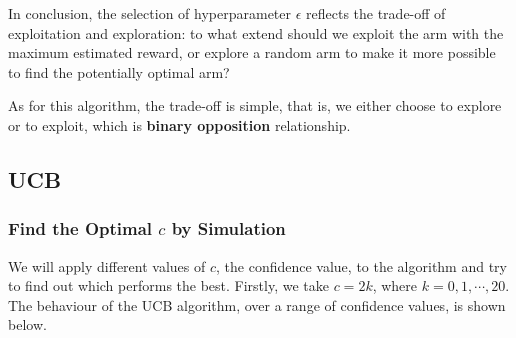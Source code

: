 \documentclass[11pt]{article}
\begin{document}
In conclusion, the selection of hyperparameter \(\epsilon\) reflects the
trade-off of exploitation and exploration: to what extend should we
exploit the arm with the maximum estimated reward, or explore a random
arm to make it more possible to find the potentially optimal arm?

As for this algorithm, the trade-off is simple, that is, we either
choose to explore or to exploit, which is \textbf{binary opposition}
relationship.

    \hypertarget{ucb}{%
\subsection{UCB}\label{ucb}}

    \hypertarget{find-the-optimal-c-by-simulation}{%
\subsubsection{\texorpdfstring{Find the Optimal \(c\) by
Simulation}{Find the Optimal c by Simulation}}\label{find-the-optimal-c-by-simulation}}

We will apply different values of \(c\), the confidence value, to the
algorithm and try to find out which performs the best. Firstly, we take
\(c=2k\), where \(k=0,1,\cdots,20\). The behaviour of the UCB algorithm,
over a range of confidence values, is shown below.
\end{document}
